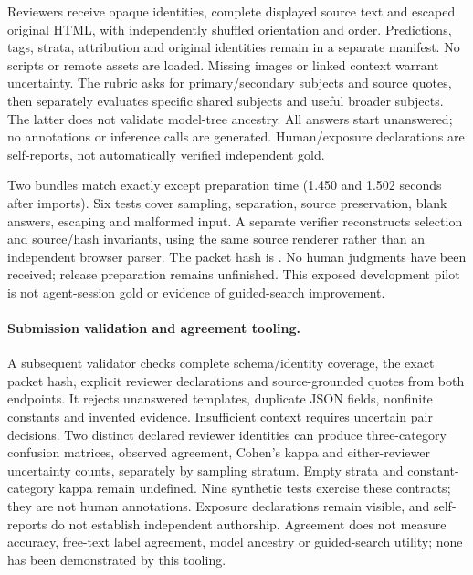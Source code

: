 \documentclass[11pt]{article}
\begin{document}
Reviewers receive opaque identities, complete displayed source text and escaped
original HTML, with independently shuffled orientation and order. Predictions,
tags, strata, attribution and original identities remain in a separate manifest.
No scripts or remote assets are loaded. Missing images or linked context warrant
uncertainty. The rubric asks for primary/secondary subjects and source quotes,
then separately evaluates specific shared subjects and useful broader subjects.
The latter does not validate model-tree ancestry. All answers start unanswered;
no annotations or inference calls are generated. Human/exposure declarations
are self-reports, not automatically verified independent gold.

Two bundles match exactly except preparation time (1.450 and 1.502 seconds after
imports). Six tests cover sampling, separation, source preservation, blank answers,
escaping and malformed input. A separate verifier reconstructs selection and
source/hash invariants, using the same source renderer rather than an independent
browser parser. The packet hash is
.
No human judgments have been received; release preparation remains unfinished.
This exposed development pilot is
not agent-session gold or evidence of guided-search improvement.

\paragraph{Submission validation and agreement tooling.}
A subsequent validator checks complete schema/identity coverage, the exact
packet hash, explicit reviewer declarations and source-grounded quotes from
both endpoints. It rejects unanswered templates, duplicate JSON fields,
nonfinite constants and invented evidence. Insufficient context requires
uncertain pair decisions. Two distinct declared reviewer identities can produce
three-category confusion matrices, observed agreement, Cohen's kappa and
either-reviewer uncertainty counts, separately by sampling stratum. Empty
strata and constant-category kappa remain undefined. Nine synthetic tests
exercise these contracts; they are not human annotations. Exposure declarations
remain visible, and self-reports do not establish independent authorship.
Agreement does not measure accuracy, free-text label agreement, model ancestry
or guided-search utility; none has been demonstrated by this tooling.
\end{document}
